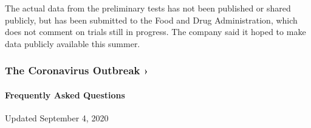 The actual data from the preliminary tests has not been published or
shared publicly, but has been submitted to the Food and Drug
Administration, which does not comment on trials still in progress. The
company said it hoped to make data publicly available this summer.

\href{https://www.nytimes3xbfgragh.onion/news-event/coronavirus?action=click\&pgtype=Article\&state=default\&region=MAIN_CONTENT_3\&context=storylines_faq}{}

\hypertarget{the-coronavirus-outbreak-}{%
\subsubsection{The Coronavirus Outbreak
›}\label{the-coronavirus-outbreak-}}

\hypertarget{frequently-asked-questions}{%
\paragraph{Frequently Asked
Questions}\label{frequently-asked-questions}}

Updated September 4, 2020

